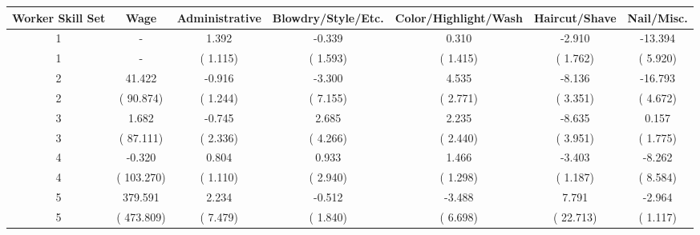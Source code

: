 
\centering
\begin{tabular}[t]{ccccccc}
\toprule
Worker Skill Set & Wage & Administrative & Blowdry/Style/Etc. & Color/Highlight/Wash & Haircut/Shave & Nail/Misc.\\
\midrule
1 & - & 1.392 & -0.339 & 0.310 & -2.910 & -13.394\\
1 & - & (    1.115) & (    1.593) & (    1.415) & (    1.762) & (    5.920)\\
2 & 41.422 & -0.916 & -3.300 & 4.535 & -8.136 & -16.793\\
2 & (   90.874) & (    1.244) & (    7.155) & (    2.771) & (    3.351) & (    4.672)\\
3 & 1.682 & -0.745 & 2.685 & 2.235 & -8.635 & 0.157\\
3 & (   87.111) & (    2.336) & (    4.266) & (    2.440) & (    3.951) & (    1.775)\\
4 & -0.320 & 0.804 & 0.933 & 1.466 & -3.403 & -8.262\\
4 & (  103.270) & (    1.110) & (    2.940) & (    1.298) & (    1.187) & (    8.584)\\
5 & 379.591 & 2.234 & -0.512 & -3.488 & 7.791 & -2.964\\
5 & (  473.809) & (    7.479) & (    1.840) & (    6.698) & (   22.713) & (    1.117)\\
\bottomrule
\end{tabular}